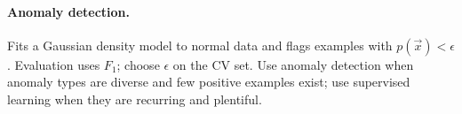 \paragraph{Anomaly detection.} Fits a Gaussian density model to normal data
and flags examples with $p(\vec{x})<\epsilon$. Evaluation uses $F_1$; choose
$\epsilon$ on the CV set. Use anomaly detection when anomaly types are diverse
and few positive examples exist; use supervised learning when they are
recurring and plentiful.
